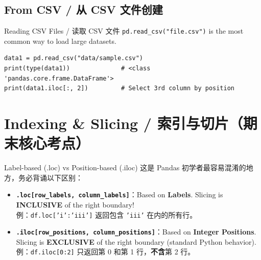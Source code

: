\documentclass[11pt,a4paper]{article}
\begin{document}
\subsection{From CSV / 从 CSV 文件创建}

\begin{examplebox}{Reading CSV Files / 读取 CSV 文件}
    \texttt{pd.read\_csv("file.csv")} is the most common way to load large datasets.
\begin{lstlisting}
data1 = pd.read_csv("data/sample.csv")
print(type(data1))              # <class 'pandas.core.frame.DataFrame'>
print(data1.iloc[:, 2])         # Select 3rd column by position
\end{lstlisting}
\end{examplebox}

\section{Indexing \& Slicing / 索引与切片（期末核心考点）}

\begin{warning}{Label-based (.loc) vs Position-based (.iloc)}
    这是 Pandas 初学者最容易混淆的地方，务必背诵以下区别：
    \begin{itemize}[itemsep=0.8em]
        \item \textbf{\texttt{.loc[row\_labels, column\_labels]}}：Based on \textbf{Labels}. Slicing is \textbf{INCLUSIVE} of the right boundary! \\
        例：\texttt{df.loc['i':'iii']} 返回包含 \texttt{'iii'} 在内的所有行。
        \item \textbf{\texttt{.iloc[row\_positions, column\_positions]}}：Based on \textbf{Integer Positions}. Slicing is \textbf{EXCLUSIVE} of the right boundary (standard Python behavior). \\
        例：\texttt{df.iloc[0:2]} 只返回第 0 和第 1 行，\textbf{不含}第 2 行。
    \end{itemize}
\end{warning}
\end{document}
